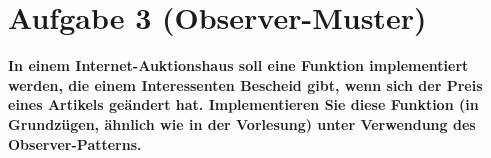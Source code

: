 \section{Aufgabe 3 (Observer-Muster)}

\textbf{In einem Internet-Auktionshaus soll eine Funktion implementiert werden, die einem
Interessenten Bescheid gibt, wenn sich der Preis eines Artikels geändert hat. Implementieren
Sie diese Funktion (in Grundzügen, ähnlich wie in der Vorlesung) unter Verwendung des
Observer-Patterns.}

\clearpage
